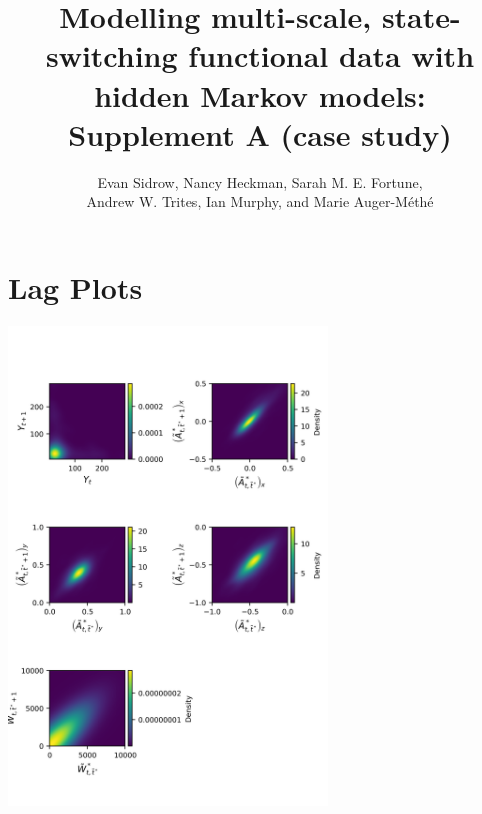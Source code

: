 \documentclass{article}
\begin{document}



\title{Modelling multi-scale, state-switching functional data with hidden Markov models: Supplement A (case study)}
\date{}
\author{Evan Sidrow, Nancy Heckman, Sarah M. E. Fortune, \\ Andrew W. Trites, Ian Murphy, and Marie Auger-M\'eth\'e}


\maketitle

\addtocounter{tablenum}{1}
\addtocounter{fignum}{1}

    \section{Lag Plots}
        
        \begin{center}
        \includegraphics[height=5in]{../Plots/2019/20190902-182840-CATs_OB_1_0_267_CarHHMM2_lagplot.png}
        \end{center}
        
\end{document}
